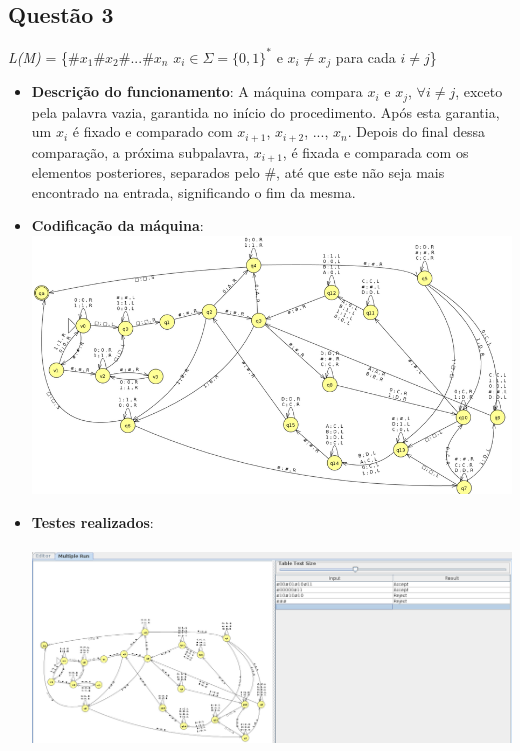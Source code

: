 \documentclass{article}
\begin{document}
\subsection*{Questão 3}
\textit{L(M)} = \{$\#x_{1}\#x_{2}\#...\#x_{n}$ \vert $ x_{i} \in \Sigma = \{0,1\}^{*}$ e $x_{i} \neq x_{j}$ para cada $i \neq j$\}
\begin{itemize}
    \item \textbf{Descrição do funcionamento}: A máquina compara $x_i$ e $x_j$, $\forall i\neq j$, exceto pela palavra vazia, garantida no início do procedimento. Após esta garantia, um $x_i$ é fixado e comparado com $x_{i+1}$, $x_{i+2}$, ..., $x_n$. Depois do final dessa comparação, a próxima subpalavra, $x_{i+1}$, é fixada e comparada com os elementos posteriores, separados pelo \#, até que este não seja mais encontrado na entrada, significando o fim da mesma.
    \item \textbf{Codificação da máquina}: \\
    \includegraphics[width=\textwidth]{questao3_ss.png}
    \item \textbf{Testes realizados}: \\ \\
    \includegraphics[width=\textwidth]{questao3_inputs.png}
\end{itemize}
\end{document}
